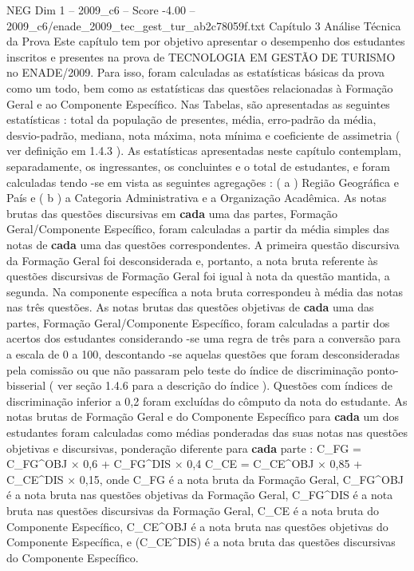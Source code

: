 \begin{textsample}{NEG Dim 1 – 2009\_c6 – Score -4.00 – 2009\_c6/enade\_2009\_tec\_gest\_tur\_ab2c78059f.txt}  \label{ex:f1_neg_211}
Capítulo 3 Análise Técnica da Prova Este capítulo tem por objetivo apresentar o desempenho dos estudantes inscritos e presentes na prova de TECNOLOGIA EM GESTÃO DE TURISMO no ENADE/2009.
Para isso, foram calculadas as estatísticas básicas da prova como um todo, bem como as estatísticas das questões relacionadas à Formação Geral e ao Componente Específico.
Nas Tabelas, são apresentadas as seguintes estatísticas : total da população de presentes, média, erro-padrão da média, desvio-padrão, mediana, nota máxima, nota mínima e coeficiente de assimetria ( ver definição em 1.4.3 ).
As estatísticas apresentadas neste capítulo contemplam, separadamente, os ingressantes, os concluintes e o total de estudantes, e foram calculadas tendo -se em vista as seguintes agregações : ( a ) Região Geográfica e País e ( b ) a Categoria Administrativa e a Organização Acadêmica.
As notas brutas das questões discursivas em \textbf{cada} uma das partes, Formação Geral/Componente Específico, foram calculadas a partir da média simples das notas de \textbf{cada} uma das questões correspondentes.
A primeira questão discursiva da Formação Geral foi desconsiderada e, portanto, a nota bruta referente às questões discursivas de Formação Geral foi igual à nota da questão mantida, a segunda.
Na componente específica a nota bruta correspondeu à média das notas nas três questões.
As notas brutas das questões objetivas de \textbf{cada} uma das partes, Formação Geral/Componente Específico, foram calculadas a partir dos acertos dos estudantes considerando -se uma regra de três para a conversão para a escala de 0 a 100, descontando -se aquelas questões que foram desconsideradas pela comissão ou que não passaram pelo teste do índice de discriminação ponto-bisserial ( ver seção 1.4.6 para a descrição do índice ).
Questões com índices de discriminação inferior a 0,2 foram excluídas do cômputo da nota do estudante.
As notas brutas de Formação Geral e do Componente Específico para \textbf{cada} um dos estudantes foram calculadas como médias ponderadas das suas notas nas questões objetivas e discursivas, ponderação diferente para \textbf{cada} parte : C\_FG = C\_FG\textasciicircum{}OBJ × 0,6 + C\_FG\textasciicircum{}DIS × 0,4 C\_CE = C\_CE\textasciicircum{}OBJ × 0,85 + C\_CE\textasciicircum{}DIS × 0,15, onde C\_FG é a nota bruta da Formação Geral, C\_FG\textasciicircum{}OBJ é a nota bruta nas questões objetivas da Formação Geral, C\_FG\textasciicircum{}DIS é a nota bruta nas questões discursivas da Formação Geral, C\_CE é a nota bruta do Componente Específico, C\_CE\textasciicircum{}OBJ é a nota bruta nas questões objetivas do Componente Específica, e (C\_CE\textasciicircum{}DIS) é a nota bruta das questões discursivas do Componente Específico.

\end{textsample}
